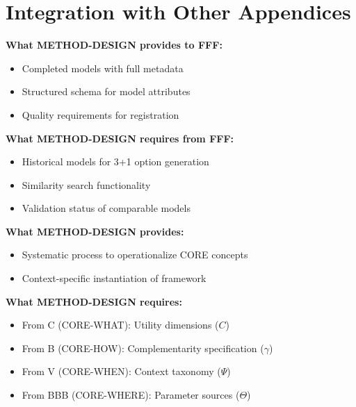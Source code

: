 \section{Integration with Other Appendices}
\label{sec:eee-integration}

\begin{tcolorbox}[colback=yellow!5!white, colframe=yellow!75!black,
    title=Integration: METHOD-DESIGN $\leftrightarrow$ METHOD-REGISTRY (FFF)]
\textbf{What METHOD-DESIGN provides to FFF:}
\begin{itemize}[nosep]
\item Completed models with full metadata
\item Structured schema for model attributes
\item Quality requirements for registration
\end{itemize}

\textbf{What METHOD-DESIGN requires from FFF:}
\begin{itemize}[nosep]
\item Historical models for 3+1 option generation
\item Similarity search functionality
\item Validation status of comparable models
\end{itemize}
\end{tcolorbox}

\begin{tcolorbox}[colback=yellow!5!white, colframe=yellow!75!black,
    title=Integration: METHOD-DESIGN $\leftrightarrow$ CORE Appendices]
\textbf{What METHOD-DESIGN provides:}
\begin{itemize}[nosep]
\item Systematic process to operationalize CORE concepts
\item Context-specific instantiation of framework
\end{itemize}

\textbf{What METHOD-DESIGN requires:}
\begin{itemize}[nosep]
\item From C (CORE-WHAT): Utility dimensions ($C$)
\item From B (CORE-HOW): Complementarity specification ($\gamma$)
\item From V (CORE-WHEN): Context taxonomy ($\Psi$)
\item From BBB (CORE-WHERE): Parameter sources ($\Theta$)
\end{itemize}
\end{tcolorbox}


